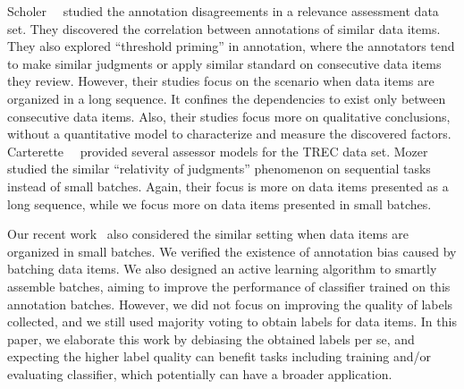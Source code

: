 Scholer~\etal~\cite{scholer:sigir2013,scholer:sigir2011} studied the annotation disagreements in 
a relevance assessment data set.  
They discovered the correlation between annotations of similar data items.  %
They also explored ``threshold priming'' in annotation, 
where the annotators tend to make similar judgments or apply similar standard on consecutive data items they review. 
However, their studies focus on the scenario when data items are organized in a long sequence.  
It confines the dependencies to exist only between consecutive data items.  
Also, their studies focus more on qualitative conclusions, without a quantitative model to characterize and measure the discovered factors.  
Carterette~\etal~\cite{carterette:effect2010} provided several assessor models for the TREC data set.  
Mozer~\etal~\cite{mozer:nips2010} studied the similar ``relativity of
judgments'' phenomenon on sequential tasks instead of small batches.  
Again, their focus is more on data items presented as a long sequence, while we focus more on data items presented in small batches.  

Our recent work~\cite{zhuang:wsdm2015} also considered the similar setting when data items are organized in small batches.  
We verified the existence of annotation bias caused by batching data items.  
We also designed an active learning algorithm to smartly assemble batches, 
aiming to improve the performance of classifier trained on this annotation batches.  
However, we did not focus on improving the quality of labels collected, 
and we still used majority voting to obtain labels for data items.  
In this paper, we elaborate this work by debiasing the obtained labels per se, 
and expecting the higher label quality can benefit tasks including training and/or evaluating classifier, 
which potentially can have a broader application.  



